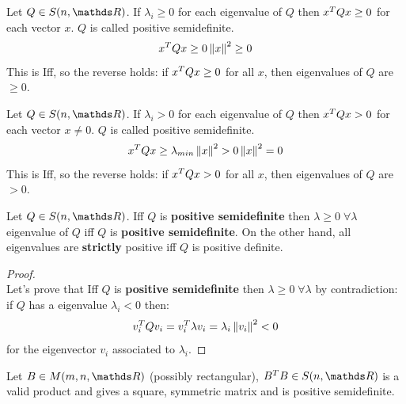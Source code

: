 \documentclass[ComputationalMathematics.tex]{subfiles}
\begin{document}
\begin{definition}
  Let $Q \in S(n, \R)$. If $\lambda_i \geq 0$ for each eigenvalue of $Q$ then ${x}^{T} Q x \ge 0$ for each vector $x$. $Q$ is called positive semidefinite.
  $$ {x}^{T} Q x \ge 0\left\lVert x\right\rVert^2 \geq 0$$
  This is Iff, so the reverse holds: if ${x}^{T} Q x \ge 0$ for all $x$, then eigenvalues of $Q$ are $\geq 0$.
  \end{definition}

\begin{definition}
    Let $Q \in S(n, \R)$. If $\lambda_i > 0$ for each eigenvalue of $Q$ then ${x}^{T} Q x > 0$ for each vector $x \neq 0$. $Q$ is called positive semidefinite.
    $$ {x}^{T} Q x \ge \lambda_{min}\left\lVert x\right\rVert^2 > 0\left\lVert x\right\rVert^2 = 0$$
    This is Iff, so the reverse holds: if ${x}^{T} Q x > 0$ for all $x$, then eigenvalues of $Q$ are $> 0$.

\end{definition}

\begin{proposition}
  Let $Q \in S(n, \R)$. Iff $Q$ is \textbf{positive semidefinite} then $\lambda \ge 0 \; \forall \lambda$ eigenvalue of $Q$ iff $Q$ is \textbf{positive semidefinite}. On the other hand, all eigenvalues are \textbf{strictly} positive iff $Q$ is positive definite.
\end{proposition}

\begin{proof}~\\
Let's prove that Iff $Q$ is \textbf{positive semidefinite} then $\lambda \ge 0 \; \forall \lambda$ by contradiction:\\
if $Q$ has a eigenvalue $\lambda_i < 0$ then:
$$ v_i^TQv_i = v_i^T \lambda v_i = \lambda_i\left\lVert v_i\right\rVert^2 < 0$$
for the eigenvector $v_i$ associated to $\lambda_i$.
  

\end{proof}

\begin{proposition}
  Let $B \in M(m, n, \R)$ (possibly rectangular), $\tr{B} B \in S(n, \R)$ is a valid product
and gives a square, symmetric matrix and is positive semidefinite.
\end{proposition}
\end{document}

